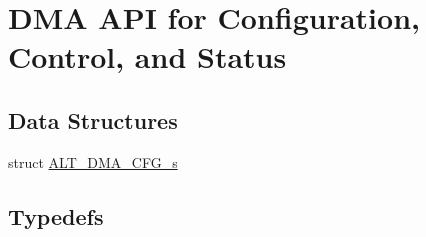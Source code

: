 \hypertarget{group__ALT__DMA__CSR}{}\section{D\+MA A\+PI for Configuration, Control, and Status}
\label{group__ALT__DMA__CSR}
\subsection*{Data Structures}
\begin{DoxyCompactItemize}
\item 
struct \mbox{\hyperlink{structALT__DMA__CFG__s}{A\+L\+T\+\_\+\+D\+M\+A\+\_\+\+C\+F\+G\+\_\+s}}
\end{DoxyCompactItemize}
\subsection*{Typedefs}
